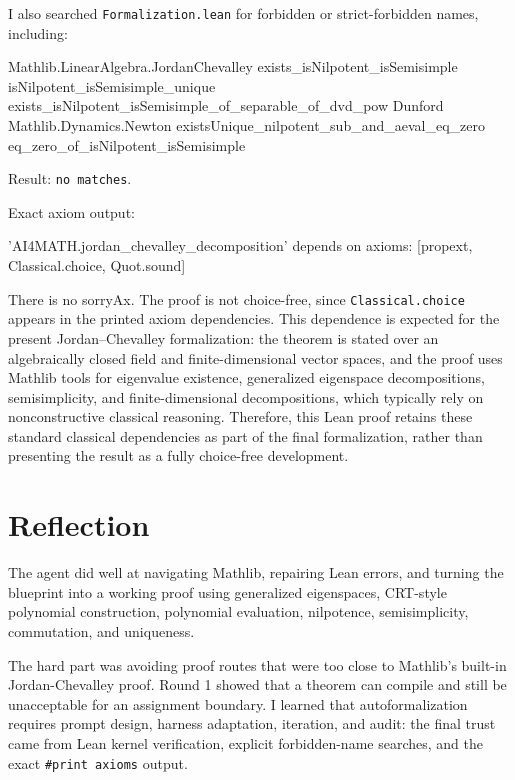 \documentclass[12pt]{article}
\begin{document}
I also searched \texttt{Formalization.lean} for forbidden or strict-forbidden names, including:

\begin{CodeBlock}
Mathlib.LinearAlgebra.JordanChevalley
exists_isNilpotent_isSemisimple
isNilpotent_isSemisimple_unique
exists_isNilpotent_isSemisimple_of_separable_of_dvd_pow
Dunford
Mathlib.Dynamics.Newton
existsUnique_nilpotent_sub_and_aeval_eq_zero
eq_zero_of_isNilpotent_isSemisimple
\end{CodeBlock}

Result: \texttt{no matches}.

Exact axiom output:

\begin{CodeBlock}
'AI4MATH.jordan_chevalley_decomposition' depends on axioms: [propext, Classical.choice, Quot.sound]
\end{CodeBlock}

There is no sorryAx. The proof is not choice-free, since \texttt{Classical.choice} appears in the printed axiom dependencies. This dependence is expected for the present Jordan--Chevalley formalization: the theorem is stated over an algebraically closed field and finite-dimensional vector spaces, and the proof uses Mathlib tools for eigenvalue existence, generalized eigenspace decompositions, semisimplicity, and finite-dimensional decompositions, which typically rely on nonconstructive classical reasoning. Therefore, this Lean proof retains these standard classical dependencies as part of the final formalization, rather than presenting the result as a fully choice-free development.

\section{Reflection}

The agent did well at navigating Mathlib, repairing Lean errors, and turning the blueprint into a working proof using generalized eigenspaces, CRT-style polynomial construction, polynomial evaluation, nilpotence, semisimplicity, commutation, and uniqueness.

The hard part was avoiding proof routes that were too close to Mathlib's built-in Jordan-Chevalley proof. Round 1 showed that a theorem can compile and still be unacceptable for an assignment boundary. I learned that autoformalization requires prompt design, harness adaptation, iteration, and audit: the final trust came from Lean kernel verification, explicit forbidden-name searches, and the exact \texttt{\#print axioms} output.
\end{document}
